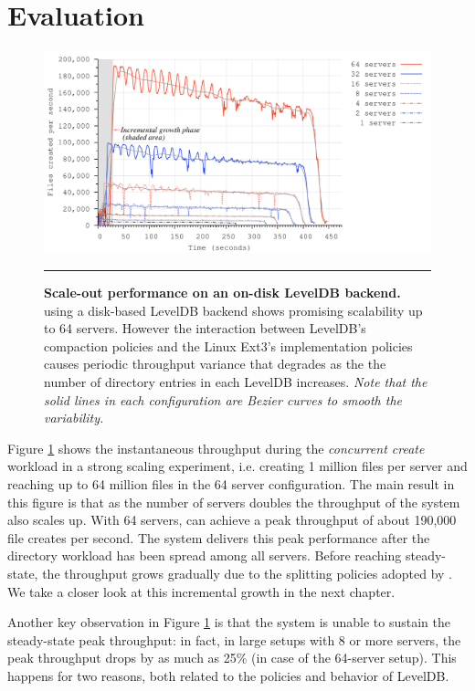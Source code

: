 \section{Evaluation}

\begin{figure}[t]  %
\centerline{\includegraphics[scale=0.33]{./figs/ldb_insertrate}}
\caption{
\textbf{Scale-out performance on an on-disk LevelDB backend.}
{\small
\giga{} using a disk-based LevelDB backend shows promising scalability
up to 64 servers. However the interaction between LevelDB's compaction policies and 
the Linux Ext3's implementation policies causes periodic throughput variance
that degrades as the the number of directory entries in each LevelDB
increases. \textit{Note that the solid lines in each configuration are Bezier
curves to smooth the variability.}
}
}
\vspace{15pt}
\hrule 
\label{graph:ldb-scaling}
\end{figure}       %

Figure \ref{graph:ldb-scaling} shows the instantaneous throughput during the 
\textit{concurrent create} workload in a strong scaling experiment, i.e.
creating 1 million files per server and reaching up to 64 million files in the
64 server configuration.
The main result in this figure is that as the number of servers doubles the
throughput of the system also scales up. With 64 servers, \giga{} can achieve a
peak throughput of about 190,000 file creates per second. The system delivers
this peak performance after the directory workload has been spread among all
servers.
Before reaching steady-state, the throughput grows gradually due to the splitting
policies adopted by \giga{}. We take a closer look at this incremental growth in
the next chapter.

Another key observation in Figure \ref{graph:ldb-scaling} is that the system is
unable to sustain the steady-state peak throughput: in fact, in large setups
with 8 or more servers, the peak throughput drops by as much as 25\% (in case
of the 64-server setup). 
This happens for two reasons, both related to the policies and behavior of
LevelDB.

